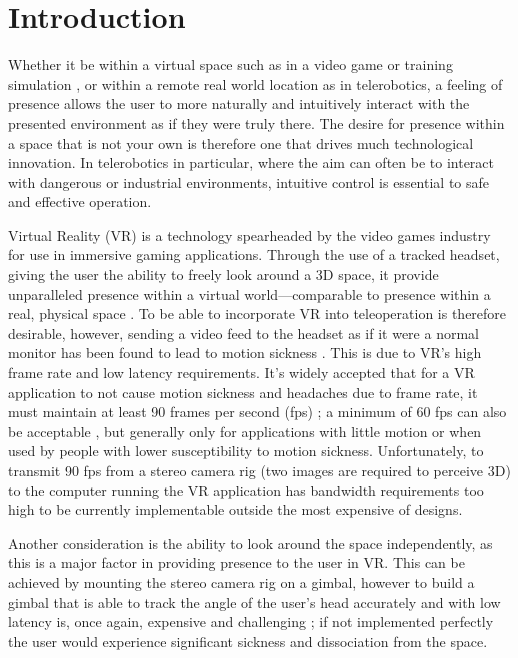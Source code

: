 \chapter{Introduction}
\label{chapter:intro}

 Whether it be within a virtual space such as in a video game or training simulation \cite{alexander2005gaming}, or within a remote real world location as in telerobotics, a feeling of presence \cite{presence} allows the user to more naturally and intuitively interact with the presented environment as if they were truly there. The desire for presence within a space that is not your own is therefore one that drives much technological innovation. In telerobotics in particular, where the aim can often be to interact with dangerous or industrial environments, intuitive control is essential to safe and effective operation.

Virtual Reality (VR) is a technology spearheaded by the video games industry for use in immersive gaming applications. Through the use of a tracked headset, giving the user the ability to freely look around a 3D space, it provide unparalleled presence within a virtual world---comparable to presence within a real, physical space \cite{loomis2016presence,McGlynn}. To be able to incorporate VR into teleoperation is therefore desirable, however, sending a video feed to the headset as if it were a normal monitor has been found to lead to motion sickness \cite{han2017design}. This is due to VR's high frame rate and low latency requirements. It's widely accepted that for a VR application to not cause motion sickness and headaches due to frame rate, it must maintain at least 90 frames per second (fps) \cite{FrameRate}; a minimum of 60 fps can also be acceptable \cite{Borg2013UsingAG}, but generally only for applications with little motion or when used by people with lower susceptibility to motion sickness. Unfortunately, to transmit 90 fps from a stereo camera rig (two images are required to perceive 3D) to the computer running the VR application has bandwidth requirements too high to be currently implementable outside the most expensive of designs.

Another consideration is the ability to look around the space independently, as this is a major factor in providing presence to the user in VR. This can be achieved by mounting the stereo camera rig on a gimbal, however to build a gimbal that is able to track the angle of the user's head accurately and with low latency is, once again, expensive and challenging \cite{DORA}; if not implemented perfectly the user would experience significant sickness and dissociation from the space.

